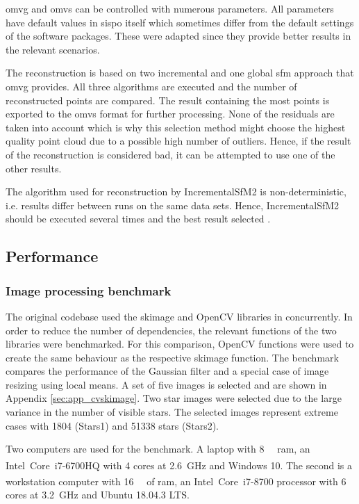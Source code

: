 \gls{omvg} and \gls{omvs} can be controlled with numerous parameters. All parameters have default values in \gls{sispo} itself which sometimes differ from the default settings of the software packages. These were adapted since they provide better results in the relevant scenarios.

The reconstruction is based on two incremental and one global \gls{sfm} approach that \gls{omvg} provides. All three algorithms are executed and the number of reconstructed points are compared. The result containing the most points is exported to the \gls{omvs} format for further processing. None of the residuals are taken into account which is why this selection method might choose the highest quality point cloud due to a possible high number of outliers. Hence, if the result of the reconstruction is considered bad, it can be attempted to use one of the other results.

The algorithm used for reconstruction by IncrementalSfM2 is non-deterministic, i.e. results differ between runs on the same data sets. Hence, IncrementalSfM2 should be executed several times and the best result selected \cite{Pajusalu2019CharacterizationMapping}.

\subsection{Performance}
\subsubsection{Image processing benchmark} \label{sec:cvskimage}
The original codebase used the \gls{skimage} and OpenCV libraries in concurrently. In order to reduce the number of dependencies, the relevant functions of the two libraries were benchmarked. For this comparison, OpenCV functions were used to create the same behaviour as the respective \gls{skimage} function. The benchmark compares the performance of the Gaussian filter and a special case of image resizing using local means. A set of five images is selected and are shown in Appendix \ref{sec:app_cvskimage}. Two star images were selected due to the large variance in the number of visible stars. The selected images represent extreme cases with 1804 (Stars1) and 51338 stars (Stars2).

Two computers are used for the benchmark. A laptop with \SI{8}{\giga\byte} \gls{ram}, an Intel\textsuperscript{\textregistered}~Core\texttrademark~i7-6700HQ with \SI{4}{} cores at \SI{2.6}{\giga\hertz} and Windows 10. The second is a workstation computer with \SI{16}{\giga\byte} of \gls{ram}, an Intel\textsuperscript{\textregistered}~Core\texttrademark~i7-8700 processor with \SI{6}{} cores at \SI{3.2}{\giga\hertz} and Ubuntu 18.04.3 LTS.

